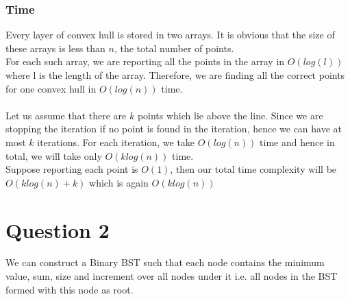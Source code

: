 \documentclass{article}
\begin{document}
        \subsubsection*{Time}
            Every layer of convex hull is stored in two arrays. It is obvious that the size of these arrays is less than $n$, the total number of points.
            \\
            For each such array, we are reporting all the points in the array in $O(log(l))$ where l is the length of the array. Therefore, we are finding all the correct points for one convex hull in $O(log(n))$ time.
            \\
            \\
            Let us assume that there are $k$ points which lie above the line. Since we are stopping the iteration if no point is found in the iteration, hence we can have at most $k$ iterations. For each iteration, we take $O(log(n))$ time and hence in total, we will take only $O(klog(n))$ time.
            \\
            Suppose reporting each point is $O(1)$, then our total time complexity will be $O(klog(n) + k)$ which is again $O(klog(n))$



\clearpage



\section*{Question 2}
    
    We can construct a Binary BST such that each node contains the minimum value, sum, size and increment over all nodes under it i.e. all nodes in the BST formed with this node as root.
    
\end{document}
